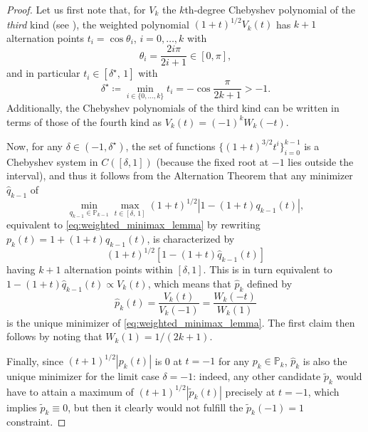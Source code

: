 \documentclass[a4paper]{article}
\theoremstyle{plain}
\theoremstyle{definition}
\theoremstyle{remark}
\begin{document}
\begin{proof}
	Let us first note that, for \(V_k\) the \(k\)th-degree Chebyshev polynomial of the \emph{third} kind (see \cite{Mason2002, Mason2005}), the weighted polynomial \((1 + t)^{1/2} V_k(t)\) has \(k + 1\) alternation points \(t_i = \cos \theta_i\), \(i = 0, \dots, k\) with
	\begin{equation*}
		\theta_i = \frac{2i \pi}{2i + 1} \in [0, \pi],
	\end{equation*}
	and in particular \(t_i \in [\delta^{\star}, \, 1]\) with
	\begin{equation*}
		\delta^{\star} \coloneqq \min_{i \in \{0, \dots, k\}} t_i = -\cos \frac{\pi}{2k + 1} > -1.
	\end{equation*}
	Additionally, the Chebyshev polynomials of the third kind can be written in terms of those of the fourth kind as \(V_k(t) = (-1)^k W_k(-t)\).
	
	Now, for any \(\delta \in (-1, \delta^{\star})\), the set of functions \(\{(1+t)^{3/2} t^i\}_{i=0}^{k-1}\) is a Chebyshev system in \(C([\delta,1])\) (because the fixed root at \(-1\) lies outside the interval), and thus it follows from the Alternation Theorem that any minimizer \(\hat{q}_{k-1}\) of
	\begin{equation*}
		\min_{q_{k-1} \in \mathbb{P}_{k-1}} \max_{t\in [\delta,\, 1]} (1+t)^{1/2} |1 - (1+t) q_{k-1}(t)|,
	\end{equation*}
	equivalent to \eqref{eq:weighted_minimax_lemma} by rewriting \(p_k(t) = 1 + (1 + t) q_{k-1}(t)\), is characterized by
	\begin{equation*}
		(1+t)^{1/2} \left[1 - (1+t) \hat{q}_{k-1}(t)\right]
	\end{equation*}
	having \(k + 1\) alternation points within \([\delta, 1]\). This is in turn equivalent to \(1 - (1+t) \hat{q}_{k-1}(t) \propto V_k(t)\), which means that \(\hat{p}_k\) defined by
	\begin{equation*}
		\hat{p}_k(t) = \frac{V_k(t)}{V_k(-1)} = \frac{W_k(-t)}{W_k(1)}
	\end{equation*}
	is the unique minimizer of \eqref{eq:weighted_minimax_lemma}. The first claim then follows by noting that \(W_k(1) = 1 / (2k+1)\).
	
	Finally, since \((t + 1)^{1/2} |p_k(t)|\) is 0 at \(t=-1\) for any \(p_k \in \mathbb{P}_k\), \(\hat{p}_k\) is also the unique minimizer for the limit case \(\delta = -1\): indeed, any other candidate \(\tilde{p}_k\) would have to attain a maximum of \((t + 1)^{1/2} |\tilde{p}_k(t)|\) precisely at \(t=-1\), which implies \(\tilde{p}_k \equiv 0\), but then it clearly would not fulfill the \(\tilde{p}_k(-1) = 1\) constraint.
\end{proof}
\end{document}
